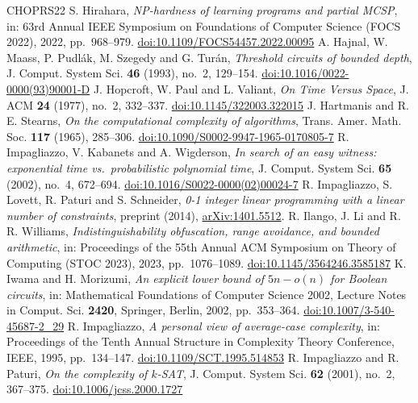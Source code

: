 \begin{thebibliography}{CHOPRS22}
 S. Hirahara, \emph{NP-hardness of learning programs and partial MCSP}, in: 63rd Annual IEEE Symposium on Foundations of Computer Science (FOCS 2022), 2022, pp.~968--979. \href{https://doi.org/10.1109/FOCS54457.2022.00095}{doi:10.1109/FOCS54457.2022.00095}
 A. Hajnal, W. Maass, P. Pudl{\'a}k, M. Szegedy and G. Tur{\'a}n, \emph{Threshold circuits of bounded depth}, J. Comput. System Sci. \textbf{46} (1993), no.~2, 129--154. \href{https://doi.org/10.1016/0022-0000(93)90001-D}{doi:10.1016/0022-0000(93)90001-D}
 J. Hopcroft, W. Paul and L. Valiant, \emph{On Time Versus Space}, J. ACM \textbf{24} (1977), no.~2, 332--337. \href{https://doi.org/10.1145/322003.322015}{doi:10.1145/322003.322015}
 J. Hartmanis and R. E. Stearns, \emph{On the computational complexity of algorithms}, Trans. Amer. Math. Soc. \textbf{117} (1965), 285--306. \href{https://doi.org/10.1090/S0002-9947-1965-0170805-7}{doi:10.1090/S0002-9947-1965-0170805-7}
 R. Impagliazzo, V. Kabanets and A. Wigderson, \emph{In search of an easy witness: exponential time vs.\ probabilistic polynomial time}, J. Comput. System Sci. \textbf{65} (2002), no.~4, 672--694. \href{https://doi.org/10.1016/S0022-0000(02)00024-7}{doi:10.1016/S0022-0000(02)00024-7}
 R. Impagliazzo, S. Lovett, R. Paturi and S. Schneider, \emph{0-1 integer linear programming with a linear number of constraints}, preprint (2014), \href{https://arxiv.org/abs/1401.5512}{arXiv:1401.5512}.
 R. Ilango, J. Li and R. R. Williams, \emph{Indistinguishability obfuscation, range avoidance, and bounded arithmetic}, in: Proceedings of the 55th Annual ACM Symposium on Theory of Computing (STOC 2023), 2023, pp.~1076--1089. \href{https://doi.org/10.1145/3564246.3585187}{doi:10.1145/3564246.3585187}
 K. Iwama and H. Morizumi, \emph{An explicit lower bound of $5n-o(n)$ for Boolean circuits}, in: Mathematical Foundations of Computer Science 2002, Lecture Notes in Comput. Sci. \textbf{2420}, Springer, Berlin, 2002, pp.~353--364. \href{https://doi.org/10.1007/3-540-45687-2_29}{doi:10.1007/3-540-45687-2\_29}
 R. Impagliazzo, \emph{A personal view of average-case complexity}, in: Proceedings of the Tenth Annual Structure in Complexity Theory Conference, IEEE, 1995, pp.~134--147. \href{https://doi.org/10.1109/SCT.1995.514853}{doi:10.1109/SCT.1995.514853}
 R. Impagliazzo and R. Paturi, \emph{On the complexity of $k$-SAT}, J. Comput. System Sci. \textbf{62} (2001), no.~2, 367--375. \href{https://doi.org/10.1006/jcss.2000.1727}{doi:10.1006/jcss.2000.1727}

\end{thebibliography}
